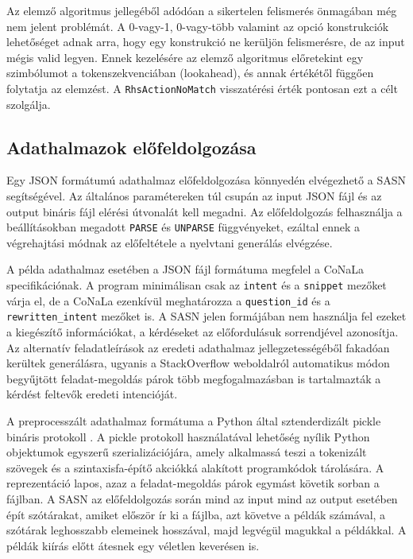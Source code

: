\documentclass[twoside, 12pt]{report}
\begin{document}
Az elemző algoritmus jellegéből adódóan a sikertelen felismerés önmagában még nem jelent problémát. A 0-vagy-1, 0-vagy-több valamint az opció konstrukciók lehetőséget adnak arra, hogy egy konstrukció ne kerüljön felismerésre, de az input mégis valid legyen. Ennek kezelésére az elemző algoritmus előretekint egy szimbólumot a tokenszekvenciában (lookahead), és annak értékétől függően folytatja az elemzést. A \verb|RhsActionNoMatch| visszatérési érték pontosan ezt a célt szolgálja.

\subsection{Adathalmazok előfeldolgozása}

Egy JSON formátumú adathalmaz előfeldolgozása könnyedén elvégezhető a SASN segítségével. Az általános paramétereken túl csupán az input JSON fájl és az output bináris fájl elérési útvonalát kell megadni. Az előfeldolgozás felhasználja a beállításokban megadott \verb|PARSE| és \verb|UNPARSE| függvényeket, ezáltal ennek a végrehajtási módnak az előfeltétele a nyelvtani generálás elvégzése.

A példa adathalmaz esetében a JSON fájl formátuma megfelel a CoNaLa \parencite{Yin+18a} specifikációnak. A program minimálisan csak az \verb|intent| és a \verb|snippet| mezőket várja el, de a CoNaLa ezenkívül meghatározza a \verb|question_id| és a \verb|rewritten_intent| mezőket is. A SASN jelen formájában nem használja fel ezeket a kiegészítő információkat, a kérdéseket az előfordulásuk sorrendjével azonosítja. Az alternatív feladatleírások az eredeti adathalmaz jellegzetességéből fakadóan kerültek generálásra, ugyanis a StackOverflow\footnotemark{} weboldalról automatikus módon begyűjtött feladat-megoldás párok több megfogalmazásban is tartalmazták a kérdést feltevők eredeti intencióját.


A preprocesszált adathalmaz formátuma a Python által sztenderdizált pickle bináris protokoll \parencite{Pit18a}. A pickle protokoll használatával lehetőség nyílik Python objektumok egyszerű szerializációjára, amely alkalmassá teszi a tokenizált szövegek és a szintaxisfa-építő akciókká alakított programkódok tárolására. A reprezentáció lapos, azaz a feladat-megoldás párok egymást követik sorban a fájlban. A SASN az előfeldolgozás során mind az input mind az output esetében épít szótárakat, amiket először ír ki a fájlba, azt követve a példák számával, a szótárak leghosszabb elemeinek hosszával, majd legvégül magukkal a példákkal. A példák kiírás előtt átesnek egy véletlen keverésen is.
\end{document}
